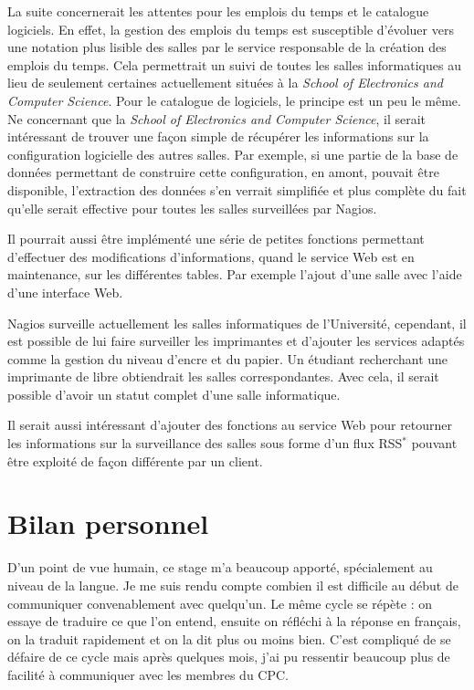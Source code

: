 La suite concernerait les attentes pour les emplois du temps et le catalogue logiciels.
En effet, la gestion des emplois du temps est susceptible d'\'evoluer vers une notation plus lisible des salles par le service responsable de la cr\'eation des emplois du temps.
Cela permettrait un suivi de toutes les salles informatiques au lieu de seulement certaines actuellement situ\'ees \`a la \textit{School of Electronics and Computer Science}.
Pour le catalogue de logiciels, le principe est un peu le m\^eme.
Ne concernant que la \textit{School of Electronics and Computer Science}, il serait int\'eressant de trouver une fa\c{c}on simple de r\'ecup\'erer les informations sur la configuration logicielle des autres salles.
Par exemple, si une partie de la base de donn\'ees permettant de construire cette configuration, en amont, pouvait \^etre disponible, l'extraction des donn\'ees s'en verrait simplifi\'ee et plus compl\`ete du fait qu'elle serait effective pour toutes les salles surveill\'ees par Nagios.

Il pourrait aussi \^etre impl\'ement\'e une s\'erie de petites fonctions permettant d'effectuer des modifications d'informations, quand le service Web est en maintenance, sur les diff\'erentes tables.
Par exemple l'ajout d'une salle avec l'aide d'une interface Web.

Nagios surveille actuellement les salles informatiques de l'Universit\'e, cependant, il est possible de lui faire surveiller les imprimantes et d'ajouter les services adapt\'es comme la gestion du niveau d'encre et du papier.
Un \'etudiant recherchant une imprimante de libre obtiendrait les salles correspondantes.
Avec cela, il serait possible d'avoir un statut complet d'une salle informatique.

Il serait aussi int\'eressant d'ajouter des fonctions au service Web pour retourner les informations sur la surveillance des salles sous forme d'un flux RSS$^*$ pouvant \^etre exploit\'e de fa\c{c}on diff\'erente par un client.


\section{Bilan personnel}

D'un point de vue humain, ce stage m'a beaucoup apport\'e, sp\'ecialement au niveau de la langue.
Je me suis rendu compte combien il est difficile au d\'ebut de communiquer convenablement avec quelqu'un.
Le m\^eme cycle se r\'ep\`ete : on essaye de traduire ce que l'on entend, ensuite on r\'efl\'echi \`a la r\'eponse en fran\c{c}ais, on la traduit rapidement et on la dit plus ou moins bien.
C'est compliqu\'e de se d\'efaire de ce cycle mais apr\`es quelques mois, j'ai pu ressentir beaucoup plus de facilit\'e \`a communiquer avec les membres du CPC.

